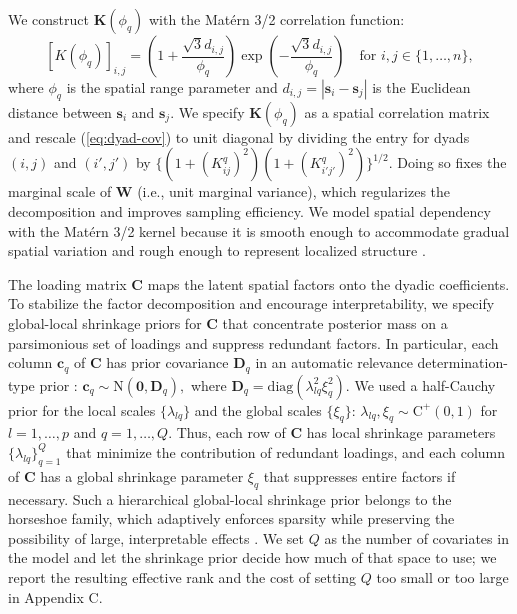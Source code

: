 \documentclass{article}
\begin{document}
We construct $\mathbf{K}(\phi_q)$ with the Matérn 3/2 correlation function:
\begin{equation}\label{eq:K}
    [K(\phi_q)]_{i,j}=\left(1+\frac{\sqrt{3}d_{i,j}}{\phi_q}\right)\exp\left(-\frac{\sqrt{3}d_{i,j}}{\phi_q}\right)\quad \text{for }i,j\in\{1,\dots,n\},
\end{equation}
where $\phi_q$ is the spatial range parameter and $d_{i,j}=|\mathbf{s}_i-\mathbf{s}_j|$ is the Euclidean distance between $\mathbf{s}_i$ and $\mathbf{s}_j$.
We specify $\mathbf{K}(\phi_q)$ as a spatial correlation matrix and rescale (\ref{eq:dyad-cov}) to unit diagonal by dividing the entry for dyads $(i,j)$ and $(i',j')$ by $\{(1+(K^q_{ij})^2)(1+(K^q_{i'j'})^2)\}^{1/2}$. Doing so fixes the marginal scale of $\mathbf{W}$ (i.e., unit marginal variance), which regularizes the decomposition and improves sampling efficiency.
We model spatial dependency with the Matérn 3/2 kernel because it 
is smooth enough to accommodate gradual spatial variation and rough enough to represent localized structure \citep{hoeting2006model}.

The loading matrix $\mathbf{C}$ maps the latent spatial factors onto the dyadic coefficients. 
To stabilize the factor decomposition and encourage interpretability, we specify global-local shrinkage priors for $\mathbf{C}$ that concentrate posterior mass on a parsimonious set of loadings and suppress redundant factors. In particular, each column $\mathbf{c}_q$ of $\mathbf{C}$ has prior covariance $\mathbf{D}_q$ in an automatic relevance determination-type prior \citep{oba2003bayesian}:
$\mathbf{c}_q\sim\text{N}(\boldsymbol0,\mathbf{D}_q),$
where $\mathbf{D}_q=\text{diag}(\lambda^2_{lq}\xi^2_q)$. We used a half-Cauchy prior for the local scales $\{\lambda_{lq}\}$ and the global scales $\{\xi_q\}$:
$\lambda_{lq},\xi_q\sim \text{C}^+(0,1)$ for $l=1,\dots,p$ and $q=1,\dots,Q$.
Thus, each row of $\mathbf{C}$ has local shrinkage parameters $\{\lambda_{lq}\}_{q=1}^Q$ that minimize the contribution of redundant loadings, and each column of $\mathbf{C}$ has a global shrinkage parameter $\xi_q$ that suppresses entire factors if necessary. Such a hierarchical global-local shrinkage prior belongs to the horseshoe family, which adaptively enforces sparsity while preserving the possibility of large, interpretable effects \citep{carvalho2009handling}. 
We set $Q$ as the number of covariates in the model and let the shrinkage prior decide how much of that space to use; we report the resulting effective rank and the cost of setting $Q$ too small or too large in Appendix C.
\end{document}
